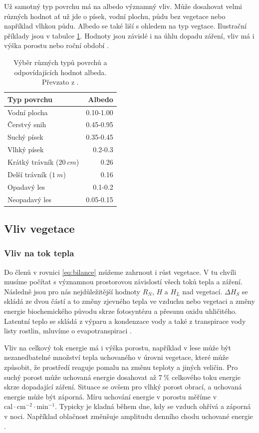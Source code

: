 Už samotný typ povrchu má na albedo významný vliv. Může dosahovat velmi různých hodnot ať už jde o písek, vodní plochu, půdu bez vegetace nebo například vlhkou půdu. Albedo se také liší s ohledem na typ vegtace. Ilustrační příklady jsou v tabulce \ref{tab:albedo}. Hodnoty jsou závislé i na úhlu dopadu záření, vliv má i výška porostu nebo roční období \parencite{arya2001,alma}.

\begin{table}
\centering\footnotesize\sf
\begin{tabular}{lr}
\toprule
Typ povrchu & Albedo \\
\midrule
Vodní plocha & 0.10-1.00 \\
Čerstvý snih & 0.45-0.95 \\
Suchý písek & 0.35-0.45\\
Vlhký písek & 0.2-0.3\\
Krátký trávník ($\SI{20}{cm}$) & 0.26\\
Delší trávník ($\SI{1}{m}$) & 0.16\\
Opadavý les & 0.1-0.2\\
Neopadavý les & 0.05-0.15\\
\bottomrule
\end{tabular}
	\caption{Výběr různých typů povrchů a odpovídajících hodnot albeda. Převzato z \parencite{arya2001}.}
\label{tab:albedo}
\end{table}


\subsection{Vliv vegetace} \label{chap:veg}
\subsubsection{Vliv na tok tepla}
Do členů v rovnici \ref{eq:bilance} můžeme zahrnout i růst vegetace. V tu chvíli musíme počítat s významnou prostorovou závislostí všech toků tepla a záření. Následně jsou pro nás nejdůležitější hodnoty $R_N$, $H$ a $H_L$ nad vegetací. $\Delta H_S$ se skládá ze dvou částí a to změny zjevného tepla ve vzduchu nebo vegetaci a změny energie biochemického původu skrze fotosyntézu a přesunu oxidu uhličitého. Latentní teplo se skládá z výparu a kondenzace vody a také z transpirace vody listy rostlin, mluvíme o evapotranspiraci \parencite{arya2001}. 

Vliv na celkový tok energie má i výška porostu, například v lese může být nezanedbatelné množství tepla uchovaného v úrovni vegetace, které může způsobit, že prostředí reaguje pomalu na změnu teploty a jiných veličin. Pro suchý porost může uchovaná energie dosahovat až $\SI{7}{\%}$ celkového toku energie skrze dopadající záření. Situace se ovšem pro vlhký porost obrací, a uchovaná energie může být záporná. Míru uchování energie v porostu měříme v $\si{}{\text{cal}\cdot \text{cm}^{-2}\cdot \text{min}^{-1}}$. Typicky je kladná během dne, kdy se vzduch ohřívá a záporná v noci. Například oblačnost změnšuje amplitudu denního chodu uchované energie \parencite{alma}. 

